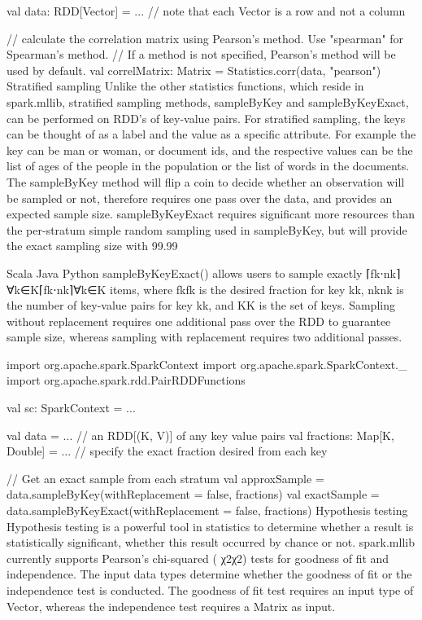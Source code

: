 val data: RDD[Vector] = ... // note that each Vector is a row and not a column

// calculate the correlation matrix using Pearson's method. Use "spearman" for Spearman's method.
// If a method is not specified, Pearson's method will be used by default. 
val correlMatrix: Matrix = Statistics.corr(data, "pearson")
Stratified sampling
Unlike the other statistics functions, which reside in spark.mllib, stratified sampling methods, sampleByKey and sampleByKeyExact, can be performed on RDD’s of key-value pairs. For stratified sampling, the keys can be thought of as a label and the value as a specific attribute. For example the key can be man or woman, or document ids, and the respective values can be the list of ages of the people in the population or the list of words in the documents. The sampleByKey method will flip a coin to decide whether an observation will be sampled or not, therefore requires one pass over the data, and provides an expected sample size. sampleByKeyExact requires significant more resources than the per-stratum simple random sampling used in sampleByKey, but will provide the exact sampling size with 99.99%

Scala
Java
Python
sampleByKeyExact() allows users to sample exactly ⌈fk⋅nk⌉∀k∈K⌈fk⋅nk⌉∀k∈K items, where fkfk is the desired fraction for key kk, nknk is the number of key-value pairs for key kk, and KK is the set of keys. Sampling without replacement requires one additional pass over the RDD to guarantee sample size, whereas sampling with replacement requires two additional passes.

import org.apache.spark.SparkContext
import org.apache.spark.SparkContext._
import org.apache.spark.rdd.PairRDDFunctions

val sc: SparkContext = ...

val data = ... // an RDD[(K, V)] of any key value pairs
val fractions: Map[K, Double] = ... // specify the exact fraction desired from each key

// Get an exact sample from each stratum
val approxSample = data.sampleByKey(withReplacement = false, fractions)
val exactSample = data.sampleByKeyExact(withReplacement = false, fractions)
Hypothesis testing
Hypothesis testing is a powerful tool in statistics to determine whether a result is statistically significant, whether this result occurred by chance or not. spark.mllib currently supports Pearson’s chi-squared ( χ2χ2) tests for goodness of fit and independence. The input data types determine whether the goodness of fit or the independence test is conducted. The goodness of fit test requires an input type of Vector, whereas the independence test requires a Matrix as input.

